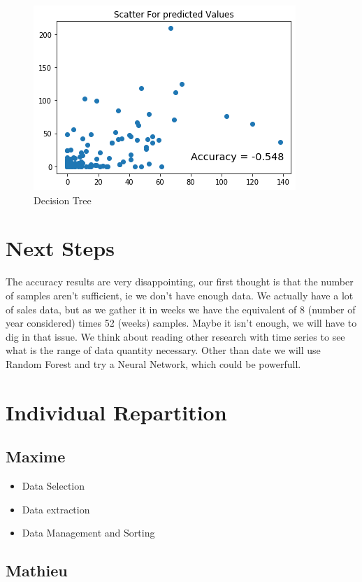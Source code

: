 \documentclass{report}
\begin{document}
\begin{figure}[h!]
\centering
\includegraphics[scale=0.5]{DecisionTree}
\caption{Decision Tree}
\end{figure}


\section{Next Steps}

The accuracy results are very disappointing, our first thought is that the number of samples aren't sufficient, ie we don't have enough data. We actually have a lot of sales data, but as we gather it in weeks we have the equivalent of 8 (number of year considered) times 52 (weeks) samples. Maybe it isn't enough, we will have to dig in that issue. We think about reading other research with time series to see what is the range of data quantity necessary.
Other than date we will use Random Forest and try a Neural Network, which could be powerfull. 

\section{Individual Repartition}

\subsection{Maxime}

\begin{itemize}
\item Data Selection
\item Data extraction
\item Data Management and Sorting
\end{itemize}



\subsection{Mathieu}
\end{document}
